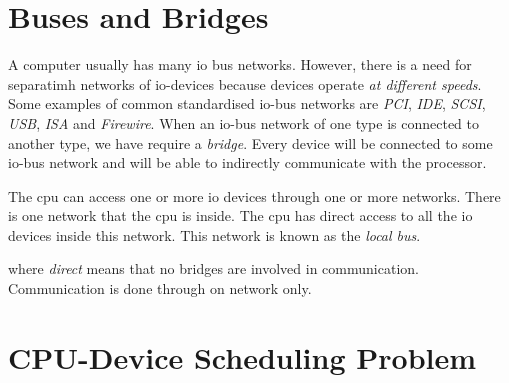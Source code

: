 \section{Buses and Bridges}

A computer usually has many io bus networks. However, there is a need for separatimh networks 
of io-devices because devices operate \textit{at different speeds}. 
Some examples of common standardised io-bus networks are \textit{PCI}, 
\textit{IDE}, \textit{SCSI}, \textit{USB}, \textit{ISA} and \textit{Firewire}. 
When an io-bus network of one type is connected to another type, we have require a \textit{bridge}. 
Every device will be connected to some io-bus network and will be able to indirectly communicate with the processor. 

The cpu can access one or more io devices through one or more networks.
There is one network that the cpu is inside. The cpu has direct access to all the io devices 
inside this network. This network is known as the \textit{local bus}. 

where \textit{direct} means that no bridges are involved in communication. 
Communication is done through on network only. 

\section{CPU-Device Scheduling Problem}

\begin{figure}[h]
\end{figure}


